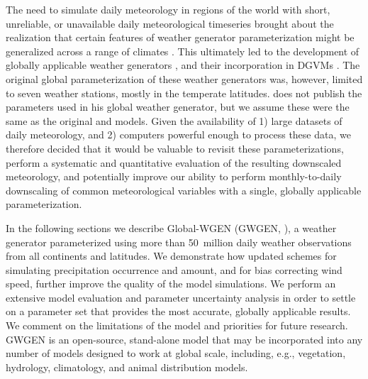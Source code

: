 \begin{refsection}
The need to simulate daily meteorology in regions of the world with short, unreliable, or unavailable daily meteorological timeseries brought about the realization that certain features of weather generator parameterization might be generalized across a range of climates \citep{GengAuburn1987,GengDevriesSupit1986}. This ultimately led to the development of globally applicable weather generators \citep{Friend1998}, and their incorporation in DGVMs \citep{BondeauSmithZaehleEtAl2007,GertenSchaphoffHaberlandtEtAl2004,PfeifferSpessaKaplan2013}. The original global parameterization \citep{GengDevriesSupit1986} of these weather generators was, however, limited to seven weather stations, mostly in the temperate latitudes. \cite{Friend1998} does not publish the parameters used in his global weather generator, but we assume these were the same as the original \cite{GengAuburn1987} and \cite{GengDevriesSupit1986} models. Given the availability of 1) large datasets of daily meteorology, and 2) computers powerful enough to process these data, we therefore decided that it would be valuable to revisit these parameterizations, perform a systematic and quantitative evaluation of the resulting downscaled meteorology, and potentially improve our ability to perform monthly-to-daily downscaling of common meteorological variables with a single, globally applicable parameterization.

In the following sections we describe Global-WGEN (GWGEN, \cite{SommerKaplan2017b}), a weather generator parameterized using more than 50~million daily weather observations from all continents and latitudes. We demonstrate how updated schemes for simulating precipitation occurrence and amount, and for bias correcting wind speed, further improve the quality of the model simulations. We perform an extensive model evaluation and parameter uncertainty analysis in order to settle on a parameter set that provides the most accurate, globally applicable results. We comment on the limitations of the model and priorities for future research. GWGEN is an open-source, stand-alone model that may be incorporated into any number of models designed to work at global scale, including, e.g., vegetation, hydrology, climatology, and animal distribution models.



\end{refsection}
